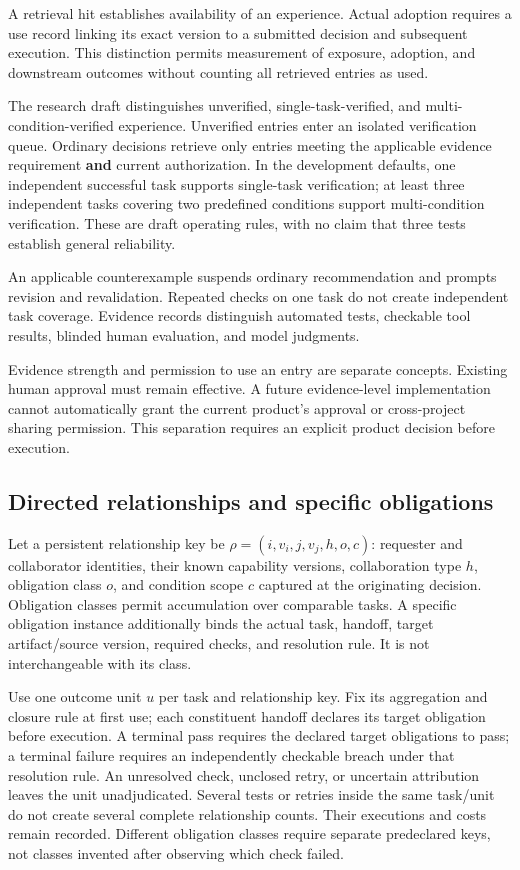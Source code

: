 \documentclass[
  english,
  11pt,
]{article}
\begin{document}
A retrieval hit establishes availability of an experience. Actual
adoption requires a use record linking its exact version to a submitted
decision and subsequent execution. This distinction permits measurement
of exposure, adoption, and downstream outcomes without counting all
retrieved entries as used.

The research draft distinguishes unverified, single-task-verified, and
multi-condition-verified experience. Unverified entries enter an
isolated verification queue. Ordinary decisions retrieve only entries
meeting the applicable evidence requirement \textbf{and} current
authorization. In the development defaults, one independent successful
task supports single-task verification; at least three independent tasks
covering two predefined conditions support multi-condition verification.
These are draft operating rules, with no claim that three tests
establish general reliability.

An applicable counterexample suspends ordinary recommendation and
prompts revision and revalidation. Repeated checks on one task do not
create independent task coverage. Evidence records distinguish automated
tests, checkable tool results, blinded human evaluation, and model
judgments.

Evidence strength and permission to use an entry are separate concepts.
Existing human approval must remain effective. A future evidence-level
implementation cannot automatically grant the current product's approval
or cross-project sharing permission. This separation requires an
explicit product decision before execution.

\subsection{Directed relationships and specific
obligations}\label{directed-relationships-and-specific-obligations}

Let a persistent relationship key be \(\rho=(i,v_i,j,v_j,h,o,c)\):
requester and collaborator identities, their known capability versions,
collaboration type \(h\), obligation class \(o\), and condition scope
\(c\) captured at the originating decision. Obligation classes permit
accumulation over comparable tasks. A specific obligation instance
additionally binds the actual task, handoff, target artifact/source
version, required checks, and resolution rule. It is not interchangeable
with its class.

Use one outcome unit \(u\) per task and relationship key. Fix its
aggregation and closure rule at first use; each constituent handoff
declares its target obligation before execution. A terminal pass
requires the declared target obligations to pass; a terminal failure
requires an independently checkable breach under that resolution rule.
An unresolved check, unclosed retry, or uncertain attribution leaves the
unit unadjudicated. Several tests or retries inside the same task/unit
do not create several complete relationship counts. Their executions and
costs remain recorded. Different obligation classes require separate
predeclared keys, not classes invented after observing which check
failed.
\end{document}

